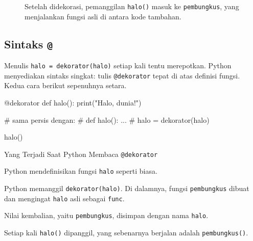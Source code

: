 \begin{figure}[htbp]
\centering
{}
\caption{Setelah didekorasi, pemanggilan \texttt{halo()} masuk ke \texttt{pembungkus}, yang menjalankan fungsi asli di antara kode tambahan.}
\end{figure}

\subsection{Sintaks \texttt{@}}

Menulis \texttt{halo = dekorator(halo)} setiap kali tentu merepotkan. Python menyediakan sintaks singkat: tulis \texttt{@dekorator} tepat di atas definisi fungsi. Kedua cara berikut sepenuhnya setara.

\begin{kode}[Sintaks @]
@dekorator
def halo():
    print("Halo, dunia!")

# sama persis dengan:
# def halo(): ...
# halo = dekorator(halo)

halo()
\end{kode}

\begin{langkah}{Yang Terjadi Saat Python Membaca \texttt{@dekorator}}
  \item Python mendefinisikan fungsi \texttt{halo} seperti biasa.
  \item Python memanggil \texttt{dekorator(halo)}. Di dalamnya, fungsi \texttt{pembungkus} dibuat dan mengingat \texttt{halo} asli sebagai \texttt{func}.
  \item Nilai kembalian, yaitu \texttt{pembungkus}, disimpan dengan nama \texttt{halo}.
  \item Setiap kali \texttt{halo()} dipanggil, yang sebenarnya berjalan adalah \texttt{pembungkus()}.
\end{langkah}

